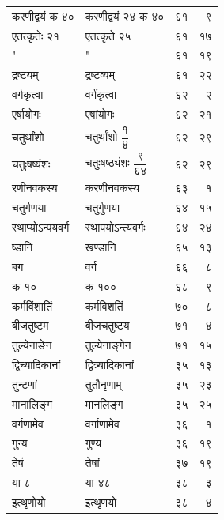 \documentclass[11pt, openany]{book}
\begin{document}
{\begin{longtable}{llrr}
\newpage
करणीद्वयं क ४० &करणीद्वयं २४ क ४०& ६१& ९\\
एतत्कृतेः २१& एतत्कृते २५& ६१& १७\\
\hspace{2mm} "  & \hspace{2mm} " &६१& १९\\
द्रष्टयम् &द्रष्टव्यम् &६१& २२\\
वर्गकृत्वा &वर्गंकृत्वा &६२& २\\
एर्षायोगः &एषांयोगः &६२& २१\\
चतुर्थांशो &चतुर्थांशो $\dfrac{\text{१}}{\text{४}}$ &६२& २९\\
चतुःषष्यंशः &चतुःषष्ठ्यंशः $\dfrac{\text{९}}{\text{६४}}$ &६२& २९\\
रणीनवकस्य& करणीनवकस्य &६३& १\\
चतुर्गणया &चतुर्गुणया &६४& १५\\
स्थाप्योऽन्पयवर्ग& स्थापयोऽन्त्यवर्गः &६४& २४\\
ष्डानि &खण्डानि &६५& १३\\
बग &वर्ग &६६& ८\\
क १० &क १००& ६८ &९\\
कर्मविंशातिं &कर्मविशतिं& ७०& ८\\
बीजतुष्टम &बीजचतुष्टय &७१& ४\\
तुल्येनाङेन &तुल्येनाङ्गेन& ७१& १५\\
द्विच्यादिकानां& द्वित्र्यादिकानां& ३५& १३\\
तुन्टणां &तुतौनृणाम् &३५& २३\\
मानालिङ्ग &मानलिङ्ग& ३५ &२५\\
वर्गणामेव &वर्गाणामेव &३६& १\\
गुन्य& गुण्य &३६& १९\\
तेषं& तेषां &३७& १९\\
या ८& या ४८& ३८& ३\\
इत्थृणोयो &इत्थृणयो &३८& ४\\


\end{longtable}}
\end{document}
